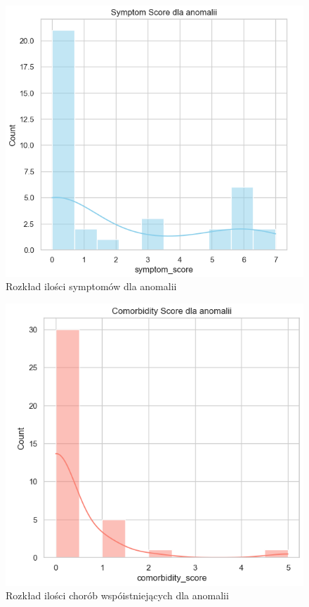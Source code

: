 \documentclass[a4paper,fleqn]{cas-dc}
\begin{document}
\begin{figure}[h]
	\includegraphics[scale=.73]{wykresy/wykres2.1.png}
	\caption{Rozkład ilości symptomów dla anomalii}
	\label{FIG:1}
\end{figure}

\begin{figure}[h]
	\includegraphics[scale=.73]{wykresy/wykres2.2.png}
	\caption{ Rozkład ilości chorób wspóistniejących dla anomalii}
	\label{FIG:1}
\end{figure}
\end{document}
